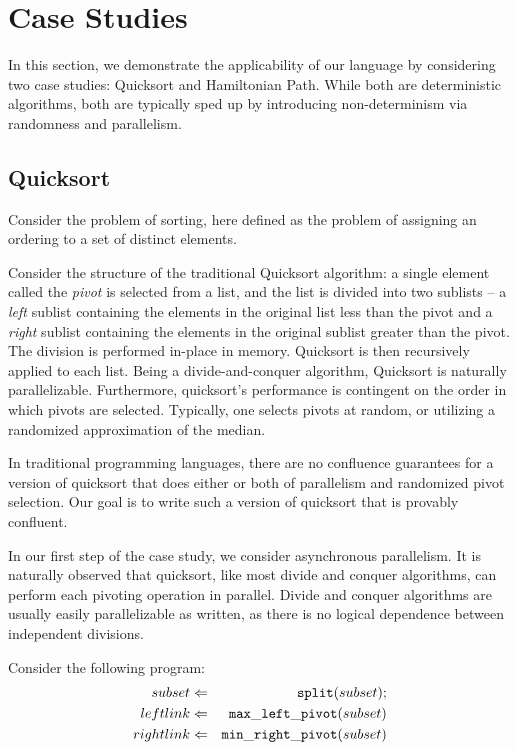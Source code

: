 \section{Case Studies}

In this section, we demonstrate the applicability of our language by considering two case studies: Quicksort and Hamiltonian Path.  While both are deterministic algorithms, both are typically sped up by introducing non-determinism via randomness and parallelism.

\subsection{Quicksort}
\label{sec:qscs}

Consider the problem of sorting, here defined as the problem of assigning an ordering to a set of distinct elements.

Consider the structure of the traditional Quicksort algorithm: a single element called the {\em pivot} is selected from a list, and the list is divided into two sublists -- a {\em left} sublist containing the elements in the original list less than the pivot and a {\em right} sublist containing the elements in the original sublist greater than the pivot.  The division is performed in-place in memory.  Quicksort is then recursively applied to each list.  Being a divide-and-conquer algorithm, Quicksort is naturally parallelizable.  Furthermore, quicksort's performance is contingent on the order in which pivots are selected.  Typically, one selects pivots at random, or utilizing a randomized approximation of the median.

In traditional programming languages, there are no confluence guarantees for a version of quicksort that does either or both of parallelism and randomized pivot selection.  Our goal is to write such a version of quicksort that is provably confluent.

In our first step of the case study, we consider asynchronous parallelism.  It is naturally observed that quicksort, like most divide and conquer algorithms, can perform each pivoting operation in parallel.  Divide and conquer algorithms are usually easily parallelizable as written, as there is no logical dependence between independent divisions.

Consider the following program:
\begin{eqnarray*}
subset &\Leftarrow& {\tt split}(subset); \\
leftlink &\Leftarrow& {\tt max\_left\_pivot}(subset) \\
rightlink &\Leftarrow& {\tt min\_right\_pivot}(subset)
\end{eqnarray*}

